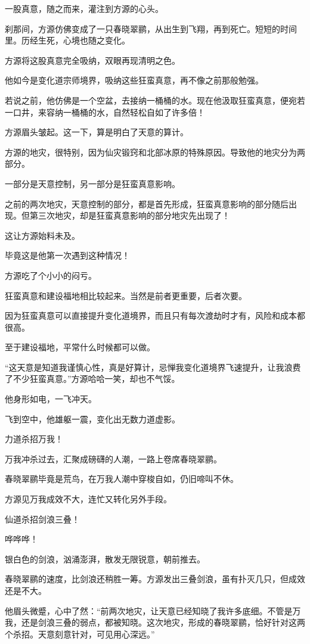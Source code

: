 \begin{this_body}
一股真意，随之而来，灌注到方源的心头。

刹那间，方源仿佛变成了一只春晓翠鹂，从出生到飞翔，再到死亡。短短的时间里。历经生死，心境也随之变化。

方源将这股真意完全吸纳，双眼再现清明之色。

他如今是变化道宗师境界，吸纳这些狂蛮真意，再不像之前那般勉强。

若说之前，他仿佛是一个空盆，去接纳一桶桶的水。现在他汲取狂蛮真意，便宛若一口井，来容纳一桶桶的水，自然轻松自如了许多倍！

方源眉头皱起。这一下，算是明白了天意的算计。

方源的地灾，很特别，因为仙灾锻窍和北部冰原的特殊原因。导致他的地灾分为两部分。

一部分是天意控制，另一部分是狂蛮真意影响。

之前的两次地灾，天意控制的部分，都是首先形成，狂蛮真意影响的部分随后出现。但第三次地灾，却是狂蛮真意影响的部分地灾先出现了！

这让方源始料未及。

毕竟这是他第一次遇到这种情况！

方源吃了个小小的闷亏。

狂蛮真意和建设福地相比较起来。当然是前者更重要，后者次要。

因为狂蛮真意可以直接提升变化道境界，而且只有每次渡劫时才有，风险和成本都很高。

至于建设福地，平常什么时候都可以做。

“这天意是知道我谨慎心性，真是好算计，忌惮我变化道境界飞速提升，让我浪费了不少狂蛮真意。”方源哈哈一笑，却也不气馁。

他身形如电，一飞冲天。

飞到空中，他雄躯一震，变化出无数力道虚影。

力道杀招万我！

万我冲杀过去，汇聚成磅礴的人潮，一路上卷席春晓翠鹂。

春晓翠鹂毕竟是荒鸟，在万我人潮中穿梭自如，仍旧啼叫不休。

方源见万我成效不大，连忙又转化另外手段。

仙道杀招剑浪三叠！

哗哗哗！

银白色的剑浪，汹涌澎湃，散发无限锐意，朝前推去。

春晓翠鹂的速度，比剑浪还稍胜一筹。方源发出三叠剑浪，虽有扑灭几只，但成效还是不大。

他眉头微蹙，心中了然：“前两次地灾，让天意已经知晓了我许多底细。不管是万我，还是剑浪三叠的弱点，都被知晓。这次地灾，形成的春晓翠鹂，恰好针对这两个杀招。天意刻意针对，可见用心深远。”


\end{this_body}
